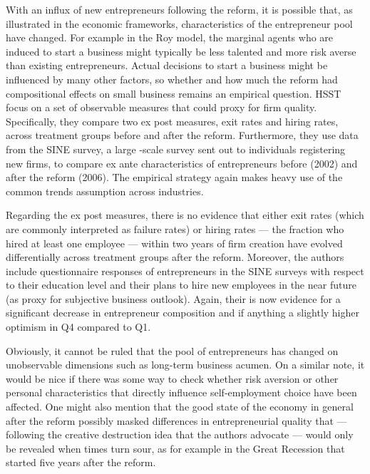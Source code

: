 With an influx of new entrepreneurs following the reform, it is possible that, as illustrated in the economic frameworks, characteristics of the entrepreneur pool have changed. For example in the Roy model, the marginal agents who are induced to start a business might typically be less talented and more risk averse than existing entrepreneurs. Actual decisions to start a business might be influenced by many other factors, so whether and how much the reform had compositional effects on small business remains an empirical question. HSST focus on a set of observable measures that could proxy for firm quality. Specifically, they compare two ex post measures, exit rates and hiring rates, across treatment groups before and after the reform. Furthermore, they use data from the SINE survey, a large -scale survey sent out to individuals registering new firms, to compare ex ante characteristics of entrepreneurs before (2002) and after the reform (2006). The empirical strategy again makes heavy use of the common trends assumption across industries.

Regarding the ex post measures, there is no evidence that either exit rates (which are commonly interpreted as failure rates) or hiring rates --- the fraction who hired at least one employee --- within two years of firm creation have evolved differentially across treatment groups after the reform. Moreover, the authors include questionnaire responses of entrepreneurs in the SINE surveys with respect to their education level and their plans to hire new employees in the near future (as proxy for subjective business outlook). Again, their is now evidence for a significant decrease in entrepreneur composition and if anything a slightly higher optimism in Q4 compared to Q1. \newline

\noindent Obviously, it cannot be ruled that the pool of entrepreneurs has changed on unobservable dimensions such as long-term business acumen. On a similar note, it would be nice if there was some way to check whether risk aversion or other personal characteristics that directly influence self-employment choice have been affected. One might also mention that the good state of the economy in general after the reform possibly masked differences in entrepreneurial quality that --- following the creative destruction idea that the authors advocate --- would only be revealed when times turn sour, as for example in the Great Recession that started five years after the reform.

